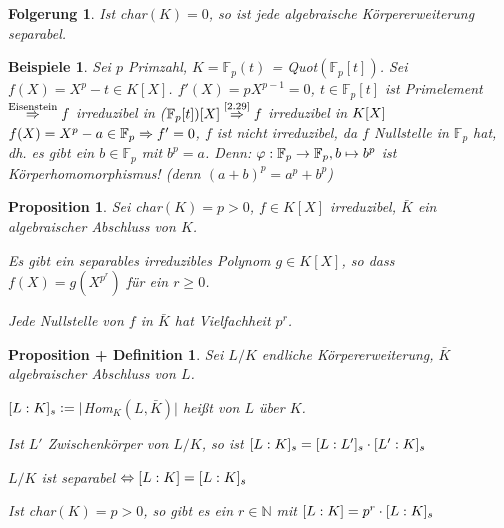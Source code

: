 \documentclass[a4paper,10pt,german]{scrbook}
\theoremstyle{saetze}
\theoremstyle{definitionen}
\newtheorem{Prop}[Def]{Proposition}
\newtheorem{PropDef}[Def]{Proposition + Definition}
\newtheorem{Folg}[Def]{Folgerung}
\newtheorem{Bspe}[Def]{Beispiele}
\begin{document}
\begin{Folg}
Ist char$(K) = 0$, so ist jede algebraische
Körpererweiterung separabel.
\end{Folg}

\begin{Bspe}
Sei $p$ Primzahl, $K = \mathbb{F}_p(t)$ =
Quot$(\mathbb{F}_p[t])$. Sei $f(X) = X^p-t \in K[X]$.
\newline $f'(X) = pX^{p-1} = 0$, $t \in \mathbb{F}_p[t]$ ist Primelement
$\overset{\mbox{\scriptsize Eisenstein}}{\Rightarrow} f$ irreduzibel in
($\mathbb{F}_p[t])[X] \overset{\mbox{\scriptsize \ref{2.29}}}{\Rightarrow} f$
irreduzibel in $K[X]\\$
\newline $f(X) = X^p - a \in \mathbb{F}_p
\Rightarrow f' = 0$, $f$ ist nicht irreduzibel, da $f$ Nullstelle in
$\mathbb{F}_p$ hat, dh. es gibt ein $b \in \mathbb{F}_p$ mit $b^p =
a$.
\newline Denn: $\varphi: \mathbb{F}_p \rightarrow \mathbb{F}_p, b
\mapsto b^p$ ist Körperhomomorphismus! (denn $(a+b)^p = a^p + b^p$)
\end{Bspe}

\begin{Prop}
Sei char$(K) = p > 0$, $f \in K[X]$ irreduzibel, $\bar K$ ein algebraischer Abschluss von $K$.

\begin{enum}
\label{3.16}
\item Es gibt ein separables irreduzibles Polynom $g \in K[X]$, so
dass $f(X) = g(X^{p^r})$ für ein $r \geq 0$.

\item Jede Nullstelle von $f$ in $\bar K$ hat Vielfachheit $p^r$.
\end{enum}
\end{Prop}

\begin{PropDef}
\label{Satz 13}
Sei $L/K$ endliche Körpererweiterung, $\bar K$
algebraischer Abschluss von $L$.
\begin{enum}
\label{Satz 13a}\item $[L:K]_s \mathrel{\mathop:}= |$Hom$_K(L,\bar K)|$ heißt
 von $L$ über $K$.

\label{Satz 13b}\item Ist $L'$ Zwischenkörper von $L/K$, so ist
$[L:K]_s = [L:L']_s \cdot [L':K]_s$

\label{Satz 13c}\item $L/K$ ist separabel $\Leftrightarrow [L:K] = [L:K]_s$

\label{Satz 13d}\item Ist char$(K) = p > 0$, so gibt es ein $r \in
\mathbb{N}$ mit $[L:K] = p^r \cdot [L:K]_s$
\end{enum}
\end{PropDef}
\end{document}
